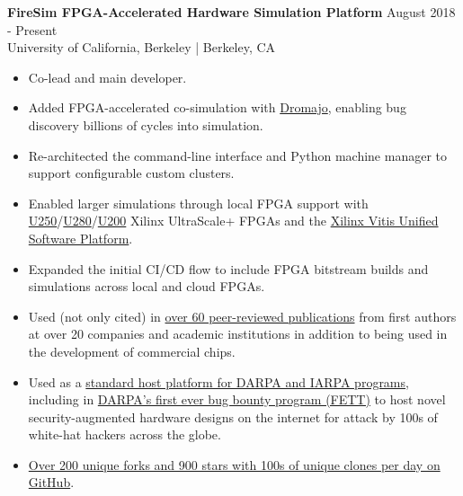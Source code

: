 \documentclass[line]{res}
\begin{document}
\begin{resume}
\label{sec:firesim}
\textbf{FireSim FPGA-Accelerated Hardware Simulation Platform} \hfill August 2018 - Present
\\
University of California, Berkeley | Berkeley, CA
\\
\vspace{-3mm}
\begin{itemize}
\item Co-lead and main developer.
\item Added FPGA-accelerated co-simulation with \href{https://github.com/chipsalliance/dromajo}{Dromajo}, enabling bug discovery billions of cycles into simulation.
\item Re-architected the command-line interface and Python machine manager to support configurable custom clusters.
\item Enabled larger simulations through local FPGA support with \href{https://www.amd.com/en/products/accelerators/alveo/u250/a-u250-a64g-pq-g.html}{U250}/\href{https://docs.amd.com/r/en-US/ds963-u280}{U280}/\href{https://www.amd.com/en/products/accelerators/alveo/u200/a-u200-a64g-pq-g.html}{U200} Xilinx UltraScale+ FPGAs and the \href{https://www.amd.com/en/products/software/adaptive-socs-and-fpgas/vitis.html}{Xilinx Vitis Unified Software Platform}.
\item Expanded the initial CI/CD flow to include FPGA bitstream builds and simulations across local and cloud FPGAs.
\item Used (not only cited) in \href{https://fires.im/publications/#userpapers}{over 60 peer-reviewed publications} from first authors at over 20 companies and academic institutions in addition to being used in the development of commercial chips.
\item Used as a \href{https://fires.im/workshop-2023/}{standard host platform for DARPA and IARPA programs}, including in \href{https://fett.darpa.mil/}{DARPA's first ever bug bounty program (FETT)} to host novel security-augmented hardware designs on the internet for attack by 100s of white-hat hackers across the globe.
\item \href{https://github.com/firesim/firesim}{Over 200 unique forks and 900 stars with 100s of unique clones per day on GitHub}.
\end{itemize}


\end{resume}
\end{document}
